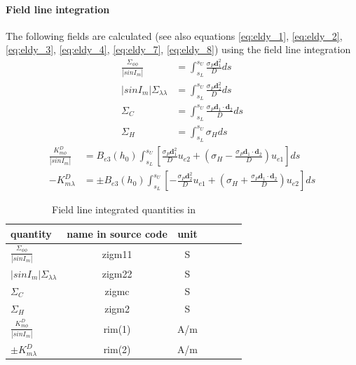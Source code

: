 \paragraph{Field line integration}
%
The following fields are calculated (see also equations \ref{eq:eldy_1}, \ref{eq:eldy_2}, 
 \ref{eq:eldy_3}, \ref{eq:eldy_4}, \ref{eq:eldy_7}, \ref{eq:eldy_8}) using the field line
 integration
%
\begin{align}
  \frac{\Sigma_{\phi \phi}}{|sinI_m|} &= \int_{s_L}^{s_U}  \frac{ \sigma_{P} \mathbf{d}_1^2}{D}
                 ds \label{eq:fldline_t1}\\
  {|sinI_m|}{\Sigma_{\lambda \lambda}} &= \int_{s_L}^{s_U}  \frac{ \sigma_{P} \mathbf{d}_2^2}{D}
                 ds \label{eq:fldline_t2}\\
  {\Sigma_{C}} &= \int_{s_L}^{s_U}  \frac{ \sigma_{P} \mathbf{d}_1 \cdot \mathbf{d}_2 }{D}
                 ds \label{eq:fldline_t3}\\
  {\Sigma_{H}} &= \int_{s_L}^{s_U}  \sigma_{H}  ds\label{eq:fldline_t4}
\end{align}
%
%
\begin{align}
  \frac{K_{m \phi}^D}{|sinI_m|} &= B_{e3}(h_0) \int_{s_L}^{s_U} \left[ \frac{ \sigma_{P} \mathbf{d}_1^2}{D}
  u_{e2} + \left( \sigma_H - \frac{\sigma_P \mathbf{d}_1 \cdot \mathbf{d}_2}{D} \right) u_{e1}
                \right] ds \label{eq:fldline_t5}\\
  - K_{m \lambda}^D &= \pm B_{e3}(h_0) \int_{s_L}^{s_U} \left[ 
   - \frac{ \sigma_{P} \mathbf{d}_2^2}{D}
  u_{e1} + \left( \sigma_H + \frac{\sigma_P \mathbf{d}_1 \cdot \mathbf{d}_2}{D} \right) u_{e2}
                \right] ds \label{eq:fldline_t6}
\end{align}
%
\begin{table}[tb]
\begin{tabular}{|p{3.0cm} ||c|c|c|c|c|c|} \hline
 quantity               &  name in source code & unit  \\ \hline \hline
%
$\frac{\Sigma_{\phi \phi}}{|sinI_m|}$   & zigm11 &  S  \\ 
${|sinI_m|}{\Sigma_{\lambda \lambda}}$  & zigm22 &  S  \\ 
${\Sigma_{C}}$                          & zigmc  &  S  \\ 
${\Sigma_{H}}$                          & zigm2  &  S  \\ 
$\frac{K_{m \phi}^D}{|sinI_m|}$         & rim(1) & A/m   \\ 
$\pm K_{m \lambda}^D$                   & rim(2) & A/m   \\ \hline
%
\end{tabular}
\caption{Field line integrated quantities in 
}
\label{tab:fldline_quantities}
\end{table} 
